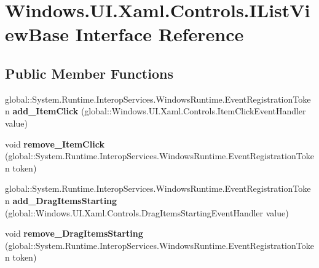 \hypertarget{interface_windows_1_1_u_i_1_1_xaml_1_1_controls_1_1_i_list_view_base}{}\section{Windows.\+U\+I.\+Xaml.\+Controls.\+I\+List\+View\+Base Interface Reference}
\label{interface_windows_1_1_u_i_1_1_xaml_1_1_controls_1_1_i_list_view_base}
\subsection*{Public Member Functions}
\begin{DoxyCompactItemize}
\item 
\mbox{\label{interface_windows_1_1_u_i_1_1_xaml_1_1_controls_1_1_i_list_view_base_a381c8434df16fa7e46ceaa5d481c0653}} 
global\+::\+System.\+Runtime.\+Interop\+Services.\+Windows\+Runtime.\+Event\+Registration\+Token {\bfseries add\+\_\+\+Item\+Click} (global\+::\+Windows.\+U\+I.\+Xaml.\+Controls.\+Item\+Click\+Event\+Handler value)
\item 
\mbox{\label{interface_windows_1_1_u_i_1_1_xaml_1_1_controls_1_1_i_list_view_base_a29b603576f74e0aaac225711b42e45e6}} 
void {\bfseries remove\+\_\+\+Item\+Click} (global\+::\+System.\+Runtime.\+Interop\+Services.\+Windows\+Runtime.\+Event\+Registration\+Token token)
\item 
\mbox{\label{interface_windows_1_1_u_i_1_1_xaml_1_1_controls_1_1_i_list_view_base_a3b355ad168b36f910e24d2c7ed82df17}} 
global\+::\+System.\+Runtime.\+Interop\+Services.\+Windows\+Runtime.\+Event\+Registration\+Token {\bfseries add\+\_\+\+Drag\+Items\+Starting} (global\+::\+Windows.\+U\+I.\+Xaml.\+Controls.\+Drag\+Items\+Starting\+Event\+Handler value)
\item 
\mbox{\label{interface_windows_1_1_u_i_1_1_xaml_1_1_controls_1_1_i_list_view_base_a98ffdf8ce44a2620717a8e03273d9029}} 
void {\bfseries remove\+\_\+\+Drag\+Items\+Starting} (global\+::\+System.\+Runtime.\+Interop\+Services.\+Windows\+Runtime.\+Event\+Registration\+Token token)

\end{DoxyCompactItemize}

